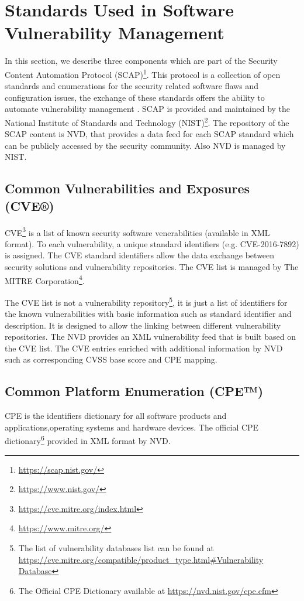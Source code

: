 \documentclass{llncs}
\begin{document}
\section{Standards	Used	in	Software	Vulnerability	Management}
 
 In	this section, we describe three	components which are part of the Security	 Content	Automation	Protocol (SCAP)\footnote{\url{https://scap.nist.gov/}}. This protocol is a collection of open standards and enumerations for the	security related software flaws	 and configuration issues, the exchange of these	standards	offers	the	ability	to	automate	vulnerability	management \cite{scap_doc}.		
 SCAP is provided	and	maintained	by	the	National	Institute	of	Standards	and	Technology (NIST)\footnote{\url{https://www.nist.gov/}}.	The	repository	of	the	SCAP	content	is	NVD, that provides	a data	feed for each SCAP	standard	
 which can	be	publicly accessed	by	the	security	community.	Also NVD is	managed	by NIST.
 
 
 \subsection{Common Vulnerabilities and Exposures (CVE®)} 
 CVE\footnote{\url{https://cve.mitre.org/index.html}} is a list of known security software venerabilities (available in XML format). To each vulnerability, a unique standard identifiers (e.g. CVE-2016-7892) is assigned. The CVE standard identifiers allow the data exchange between security solutions and vulnerability repositories. The CVE list is managed by The MITRE Corporation\footnote{\url{https://www.mitre.org/}}.

 The CVE list is not a vulnerability repository\footnote{The list of vulnerability databases list can be found at \url{https://cve.mitre.org/compatible/product_type.html\#Vulnerability Database}}, it is just a list of identifiers for the known vulnerabilities with basic information such as standard identifier and description. It is designed to allow the linking between different vulnerability repositories. The NVD provides an XML vulnerability feed that is built based on the CVE list. The CVE entries enriched with additional information by NVD such as corresponding CVSS base score and CPE mapping.    
 
 \subsection{Common Platform Enumeration (CPE™)}
 CPE is the identifiers dictionary for all software products and applications,operating systems and hardware devices. The official CPE dictionary\footnote{The Official CPE Dictionary available at \url{https://nvd.nist.gov/cpe.cfm}} provided in XML format by NVD.
  
\end{document}
